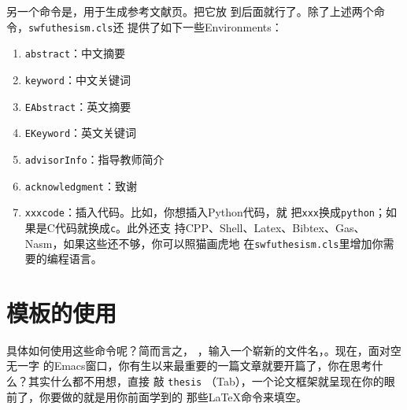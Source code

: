 \begin{latexcode}
\end{latexcode}

另一个命令是\ltx{\makebib}，用于生成参考文献页。把它放
到\ltx{\appendix}后面就行了。除了上述两个命令，\texttt{swfuthesism.cls}还
提供了如下一些Environments：

\begin{multicols}{2}
  \begin{enumerate}
  \item \verb'abstract'：中文摘要
  \item \verb'keyword'：中文关键词
  \item \verb'EAbstract'：英文摘要
  \item \verb'EKeyword'：英文关键词
  \item \verb'advisorInfo'：指导教师简介
  \item \verb'acknowledgment'：致谢
  \item \verb'xxxcode'：插入代码。比如，你想插入Python代码，就
    把\texttt{xxx}换成\texttt{python}；如果是C代码就换成\texttt{c}。此外还支
    持CPP、Shell、Latex、Bibtex、Gas、Nasm，如果这些还不够，你可以照猫画虎地
    在\texttt{swfuthesism.cls}里增加你需要的编程语言。
  \end{enumerate}
\end{multicols}

\section{模板的使用}

具体如何使用这些命令呢？简而言之， ，输入一个崭新的文件名，。现在，面对空无一字
的Emacs窗口，你有生以来最重要的一篇文章就要开篇了，你在思考什么？其实什么都不用想，直接
敲 \texttt{thesis} \LKeyTab{}（Tab），一个论文框架就呈现在你的眼前了，你要做的就是用你前面学到的
那些\LaTeX{}命令来填空。

